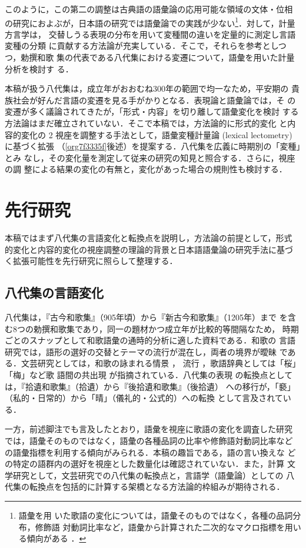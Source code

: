 \documentclass[submit]{ipsj}
\renewcommand{\ref}{\cref}
\begin{document}
このように，この第二の調整は古典語の語彙論の応用可能な領域の文体・位相
の研究におよぶが，日本語の研究では語彙論での実践が少ない\footnote{語彙を用
いた歌語の変化については，語彙そのものではなく，各種の品詞分布，修飾語
対動詞比率など，語彙から計算された二次的なマクロ指標を用いる傾向がある
\cite{nishihata1992Waka,hatano1941Waka}．}．対して，計量方言学は，
交替しうる表現の分布を用いて変種間の違いを定量的に測定し言語変種の分類
に貢献する方法論が充実している．そこで，それらを参考としつつ，勅撰和歌
集の代表である八代集における変遷について，語彙を用いた計量分析を検討す
る．

本稿が扱う八代集は，成立年がおおむね300年の範囲で均一なため，平安期の
貴族社会が好んだ言語の変遷を見る手がかりとなる．表現論と語彙論では，そ
の変遷が多く議論されてきたが，「形式・内容」を切り離して語彙変化を検討
する方法論はまだ確立されていない．そこで本稿では，方法論的に形式的変化
と内容的変化の 2 視座を調整する手法として，語彙変種計量論 (lexical
lectometry) \cite{Speelman2003Profilebased} に基づく拡張
（\ref{org7f3335f}後述）を提案する．八代集を広義に時期別の「変種」とみ
なし，その変化量を測定して従来の研究の知見と照合する．さらに，視座の調
整による結果の変化の有無と，変化があった場合の規則性も検討する．
\section{先行研究\label{org70aa2f1}}
\label{sec:orgcd56500}
本稿ではまず八代集の言語変化と転換点を説明し，方法論の前提として，形式
的変化と内容的変化の視座調整の理論的背景と日本語語彙論の研究手法に基づ
く拡張可能性を先行研究に照らして整理する．
\subsection{八代集の言語変化\label{orgf950fb0}}
\label{sec:org5b38aec}
八代集は，『古今和歌集』（905年頃）から『新古今和歌集』（1205年）まで
を含む8つの勅撰和歌集であり，同一の題材かつ成立年が比較的等間隔なため，
時期ごとのスナップとして和歌語彙の通時的分析に適した資料である．和歌の
言語研究では，語形の選好の交替とテーマの流行が混在し，両者の境界が曖昧
である．文芸研究としては，和歌の詠まれる情景 \cite{ueno1976Koshui}，
流行 \cite{kawamura1991Sekkan}，歌語辞典としては「桜」「梅」など歌
語間の共出現 \cite{katagiri1983Uta} が指摘されている．八代集の表現
の転換点としては，『拾遺和歌集』（拾遺）から『後拾遺和歌集』（後拾遺）
への移行が，「褻」（私的・日常的）から「晴」（儀礼的・公式的）への転換
として言及されている\cite{ueno1976Koshui,kawamura1991Sekkan}．

一方，前述脚注でも言及したとおり，語彙を視座に歌語の変化を調査した研究
では，語彙そのものではなく，語彙の各種品詞の比率や修飾語対動詞比率など
の語彙指標を利用する傾向がみられる\cite{tsuji1998Uta,nishihata1992Waka,hatano1941Waka}．本稿の趣旨である，語の言い換えな
どの特定の語群内の選好を視座とした数量化は確認されていない．また，計算
文学研究として，文芸研究での八代集の転換点と，言語学（語彙論）としての
八代集の転換点を包括的に計算する架橋となる方法論的枠組みが期待される．
\end{document}
